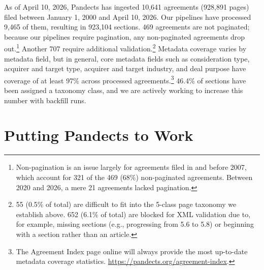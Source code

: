 \documentclass[12pt]{article}
\begin{document}
As of April 10, 2026, Pandects has ingested 10,641 agreements (928,891 pages) filed between January 1, 2000 and April 10, 2026. Our pipelines have processed 9,465 of them, resulting in 923,104 sections. 469 agreements are not paginated; because our pipelines require pagination, any non-paginated agreements drop out.\footnote{Non-pagination is an issue largely for agreements filed in and before 2007, which account for 321 of the 469 (68\%) non-paginated agreements. Between 2020 and 2026, a mere 21 agreements lacked pagination.} Another 707 require additional validation.\footnote{55 (0.5\% of total) are difficult to fit into the 5-class page taxonomy we establish above. 652 (6.1\% of total) are blocked for XML validation due to, for example, missing sections (e.g., progressing from 5.6 to 5.8) or beginning with a section rather than an article.} Metadata coverage varies by metadata field, but in general, core metadata fields such as consideration type, acquirer and target type, acquirer and target industry, and deal purpose have coverage of at least 97\% across processed agreements.\footnote{The Agreement Index page online will always provide the most up-to-date metadata coverage statistics. \url{https://pandects.org/agreement-index}.} 46.4\% of sections have been assigned a taxonomy class, and we are actively working to increase this number with backfill runs.

\section{Putting Pandects to Work}\label{sec:putting-pandects-to-work}
\end{document}
